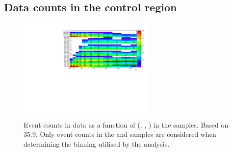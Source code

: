 \subsection{Data counts in the \texorpdfstring{\gj}{gamma+jets} control region}

\begin{figure}[h!]
  \begin{center}
    {\includegraphics[width=0.6\textwidth]{figures/control_regions/SinglePhoton.pdf}}
    \caption{Event counts in data as a function of (\njet, \nb,
      \scalht) in the \gj samples. Based on 35.9\fbinv. Only event
      counts in the \mj and \mmj samples are considered when
      determining the binning utilised by the analysis. }
    \label{fig:cr-counts-gj}
  \end{center}
\end{figure}

